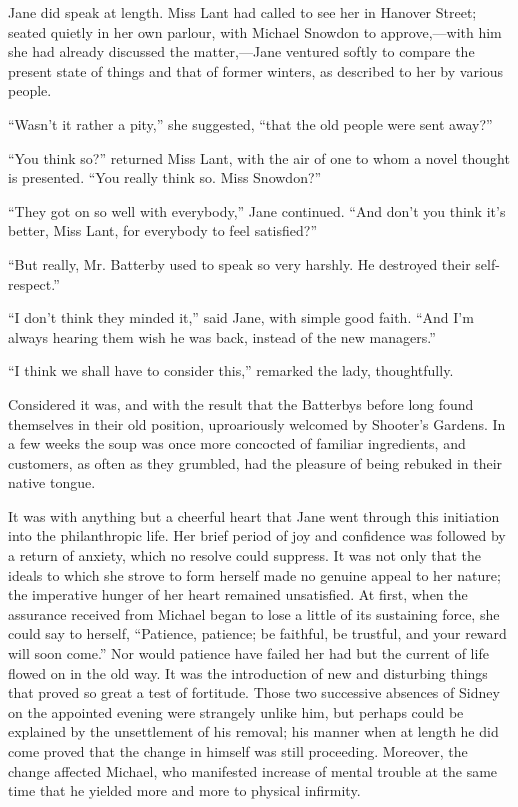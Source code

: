 Jane did speak at length. Miss Lant had called to see her in Hanover
Street; seated quietly in her own parlour, with Michael Snowdon to
approve,---with him she had already discussed the matter,---Jane
ventured softly to compare the present state of things and that of
former winters, as described to her by various people.

``Wasn't it rather a pity,'' she suggested, ``that the old people were
sent away?''

``You think so?'' returned Miss Lant, with the air of one to whom a
novel thought is presented. ``You really think so. Miss Snowdon?''

``They got on so well with everybody,''
{\protect\hypertarget{14}{}{}}Jane continued. ``And don't you think it's
better, Miss Lant, for everybody to feel satisfied?''

``But really, Mr. Batterby used to speak so very harshly. He destroyed
their self-respect.''

``I don't think they minded it,'' said Jane, with simple good faith.
``And I'm always hearing them wish he was back, instead of the new
managers.''

``I think we shall have to consider this,'' remarked the lady,
thoughtfully.

Considered it was, and with the result that the Batterbys before long
found themselves in their old position, uproariously welcomed by
Shooter's Gardens. In a few weeks the soup was once more concocted of
familiar ingredients, and customers, as often as they grumbled, had the
pleasure of being rebuked in their native tongue.

It was with anything but a cheerful heart that Jane went through this
initiation into the philanthropic life. Her brief period of joy and
confidence was followed by a return of anxiety, which no resolve could
suppress. It was not only that the ideals to which she strove to form
herself made no genuine appeal {\protect\hypertarget{15}{}{}}to her
nature; the imperative hunger of her heart remained unsatisfied. At
first, when the assurance received from Michael began to lose a little
of its sustaining force, she could say to herself, ``Patience, patience;
be faithful, be trustful, and your reward will soon come.'' Nor would
patience have failed her had but the current of life flowed on in the
old way. It was the introduction of new and disturbing things that
proved so great a test of fortitude. Those two successive absences of
Sidney on the appointed evening were strangely unlike him, but perhaps
could be explained by the unsettlement of his removal; his manner when
at length he did come proved that the change in himself was still
proceeding. Moreover, the change affected Michael, who manifested
increase of mental trouble at the same time that he yielded more and
more to physical infirmity.

